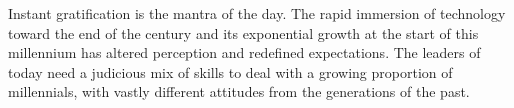 Instant gratification is the mantra of the day. The rapid immersion of technology toward the end of the century and its exponential growth at the start of this millennium has altered perception and redefined expectations. The leaders of today need a judicious mix of skills to deal with a growing proportion of millennials, with vastly different attitudes from the generations of the past.

